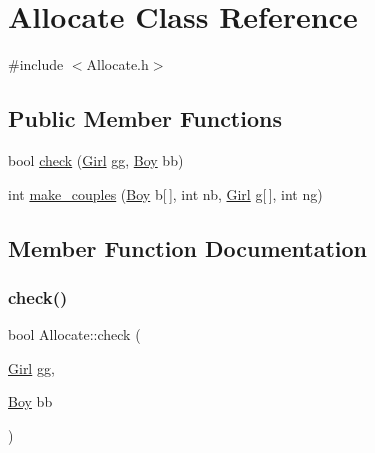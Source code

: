 \hypertarget{classAllocate}{}\section{Allocate Class Reference}
\label{classAllocate}


{\ttfamily \#include $<$Allocate.\+h$>$}

\subsection*{Public Member Functions}
\begin{DoxyCompactItemize}
\item 
bool \hyperlink{classAllocate_abe660b62ebed0cc6b60d0bf703eabbb2}{check} (\hyperlink{classGirl}{Girl} gg, \hyperlink{classBoy}{Boy} bb)
\item 
int \hyperlink{classAllocate_a898ee00791a8075741b2b50e3f2a333f}{make\+\_\+couples} (\hyperlink{classBoy}{Boy} b\mbox{[}$\,$\mbox{]}, int nb, \hyperlink{classGirl}{Girl} g\mbox{[}$\,$\mbox{]}, int ng)
\end{DoxyCompactItemize}


\subsection{Member Function Documentation}
\mbox{\label{classAllocate_abe660b62ebed0cc6b60d0bf703eabbb2}} 
\subsubsection{\texorpdfstring{check()}{check()}}
{\footnotesize\ttfamily bool Allocate\+::check (\begin{DoxyParamCaption}\item[{\hyperlink{classGirl}{Girl}}]{gg,  }\item[{\hyperlink{classBoy}{Boy}}]{bb }\end{DoxyParamCaption})\hspace{0.3cm}{\ttfamily [inline]}}

\mbox{\label{classAllocate_a898ee00791a8075741b2b50e3f2a333f}} 
